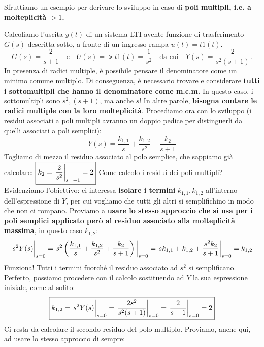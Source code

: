 \newpage
Sfruttiamo un esempio per derivare lo sviluppo in caso di \textbf{poli multipli, i.e. a molteplicità $>1$.}
\begin{esem} Calcoliamo l'uscita $y(t)$ di un sistema LTI  avente funzione di trasferimento $G(s)$ descritta sotto, a fronte di un ingresso rampa $u(t) = t1(t)$.
\begin{equation*}
G(s) = \frac{2}{s+1} \quad \textrm{e} \quad U(s) = \lat{t1(t)} = \frac{1}{s^2} \quad \textrm{da cui} \quad Y(s) = \frac{2}{s^2(s+1)}.
\end{equation*}
In presenza di radici multiple, è possibile pensare il denominatore come un minimo comune multiplo. Di conseguenza, è necessario trovare e considerare \textbf{tutti i sottomultipli che hanno il denominatore come m.c.m.} In questo caso, i sottomultipli sono $s^2, (s+1)$, ma anche $s$! In altre parole, \textbf{bisogna contare le radici multiple con la loro molteplicità}. Procediamo ora con lo sviluppo (i residui associati a poli multipli avranno un doppio pedice per distinguerli da quelli associati a poli semplici):
\begin{equation*}
Y(s) = \frac{k_{1,1}}{s} + \frac{k_{1,2}}{s^2} + \frac{k_2}{s+1}
\end{equation*}
Togliamo di mezzo il residuo associato al polo semplice, che sappiamo già calcolare: $\boxed{
k_2 = \eval{\frac{2}{s^2}}_{s=-1} = 2}$ 
Come calcolo i residui dei poli multipli? Evidenziamo l'obiettivo: ci interessa \textbf{isolare i termini} $k_{1,1}, k_{1,2}$ all'interno dell'espressione di $Y$, per cui vogliamo che tutti gli altri si semplifichino in modo che non ci rompano. Proviamo a \textbf{usare lo stesso approccio che si usa per i poli semplici applicato però al residuo associato alla molteplicità massima}, in questo caso $k_{1,2}$:
\begin{equation*}
\eval{s^2 Y(s)}_{s=0} = \eval{s^2\paren{\frac{k_{1,1}}{s} + \frac{k_{1,2}}{s^2} + \frac{k_2}{s+1}}}_{s=0} = \eval{sk_{1,1} + k_{1,2} + \frac{s^2k_2}{s+1}}_{s=0} = k_{1,2}
\end{equation*}
Funziona! Tutti i termini fuorché il residuo associato ad $s^2$ si semplificano. Perfetto, possiamo procedere con il calcolo sostituendo ad $Y$ la sua espressione iniziale, come al solito:
\begin{equation*}
\boxed{k_{1,2} = \eval{s^2 Y(s)}_{s=0} = \eval{\frac{2s^2}{s^2(s+1)}}_{s=0} = \eval{\frac{2}{s+1}}_{s=0} = 2} 
\end{equation*}
Ci resta da calcolare il secondo residuo del polo multiplo. Proviamo, anche qui, ad usare lo stesso approccio di sempre:

\end{esem}
